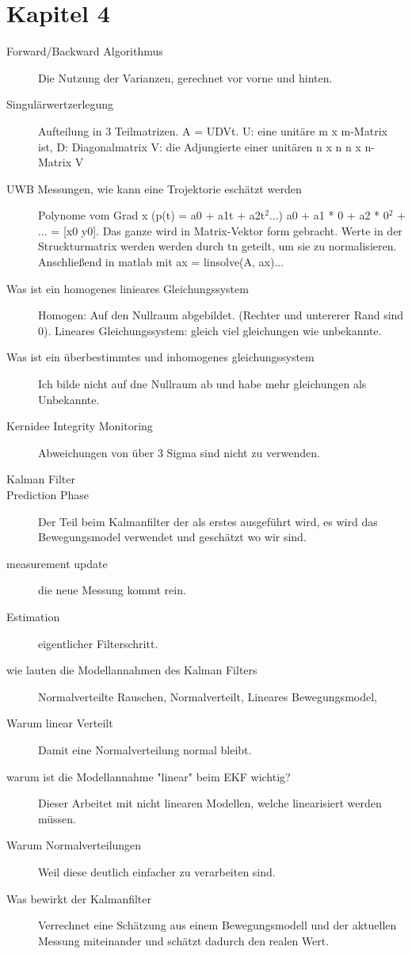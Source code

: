 \section{Kapitel 4}
\label{sec:faq:kap4}
\begin{description}
	\item[Forward/Backward Algorithmus] Die Nutzung der Varianzen, gerechnet vor vorne und hinten.
	\item[Singulärwertzerlegung] Aufteilung in 3 Teilmatrizen. A = UDVt. U: eine unitäre  m x m-Matrix ist, D: Diagonalmatrix V:  die Adjungierte einer unitären n x n  n x n-Matrix V
	\item[UWB Messungen, wie kann eine Trojektorie eschätzt werden] Polynome vom Grad x (p(t) = a0 + a1t + a2t$^2$...) a0 + a1 * 0 + a2 * 0$^2$ + ... = [x0 y0]. Das ganze wird in Matrix-Vektor form gebracht.  Werte in der Struckturmatrix werden werden durch tn geteilt, um sie zu normalisieren. Anschließend in matlab mit ax = linsolve(A, ax)... 
	\item[Was ist ein homogenes linieares Gleichungssystem] Homogen: Auf den Nullraum abgebildet. (Rechter und untererer Rand sind 0). Lineares Gleichungssystem: gleich viel gleichungen wie unbekannte.
	\item[Was ist ein überbestimmtes und inhomogenes gleichungssystem] Ich bilde nicht auf dne Nullraum ab und habe mehr gleichungen als Unbekannte.
	\item[Kernidee Integrity Monitoring] Abweichungen von über 3 Sigma sind nicht zu verwenden.
\item[Kalman Filter]	
	\item[Prediction Phase] Der Teil beim Kalmanfilter der als erstes ausgeführt wird, es wird das Bewegungsmodel verwendet und geschätzt wo wir sind.
	\item[measurement update] die neue Messung kommt rein.
	\item[Estimation] eigentlicher Filterschritt.
	\item[wie lauten die Modellannahmen des Kalman Filters] Normalverteilte Rauschen, Normalverteilt, Lineares Bewegungsmodel,
	\item[Warum linear Verteilt] Damit eine Normalverteilung normal bleibt. 
	\item[warum ist die Modellannahme "linear" beim EKF wichtig?] Dieser Arbeitet mit nicht linearen Modellen, welche linearisiert werden müssen.
	\item[Warum Normalverteilungen] Weil diese deutlich einfacher zu verarbeiten sind.  
	\item[Was bewirkt der Kalmanfilter] Verrechnet eine Schätzung aus einem Bewegungsmodell und der aktuellen Messung miteinander und schätzt dadurch den realen Wert.

\end{description}
